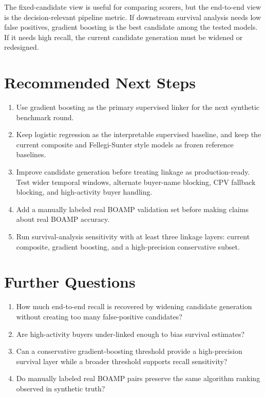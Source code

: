 \documentclass[11pt]{article}
\begin{document}
The fixed-candidate view is useful for comparing scorers, but the end-to-end view is the
decision-relevant pipeline metric. If downstream survival analysis needs low false positives, gradient
boosting is the best candidate among the tested models. If it needs high recall, the current candidate
generation must be widened or redesigned.

\section*{Recommended Next Steps}

\begin{enumerate}
\item Use gradient boosting as the primary supervised linker for the next synthetic benchmark round.
\item Keep logistic regression as the interpretable supervised baseline, and keep the current composite
and Fellegi-Sunter style models as frozen reference baselines.
\item Improve candidate generation before treating linkage as production-ready. Test wider temporal
windows, alternate buyer-name blocking, CPV fallback blocking, and high-activity buyer handling.
\item Add a manually labeled real BOAMP validation set before making claims about real BOAMP accuracy.
\item Run survival-analysis sensitivity with at least three linkage layers: current composite, gradient
boosting, and a high-precision conservative subset.
\end{enumerate}

\section*{Further Questions}

\begin{enumerate}
\item How much end-to-end recall is recovered by widening candidate generation without creating too many
false-positive candidates?
\item Are high-activity buyers under-linked enough to bias survival estimates?
\item Can a conservative gradient-boosting threshold provide a high-precision survival layer while a
broader threshold supports recall sensitivity?
\item Do manually labeled real BOAMP pairs preserve the same algorithm ranking observed in synthetic truth?
\end{enumerate}
\end{document}
